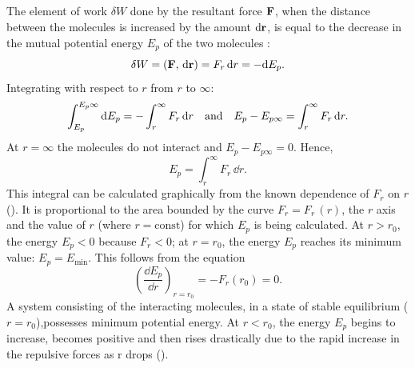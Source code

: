\subsection{}\label{12.1.6} The element of work $\delta W$ done by the resultant force $\vb{F}$, when the distance between the molecules is increased by the amount $\dd \vb{r}$, is equal to the decrease in the mutual potential energy $E_{p}$ of the two molecules :
\begin{equation*}%
\delta W = (\vb{F},\, \dd \vb{r}) = F_{r} \, \dd r = - \dd E_{p}.
\end{equation*}
Integrating with respect to $r$ from $r$ to $\infty$:
\begin{equation*}%
\int_{E_{p}}^{E_{p}\infty} \dd E_{p} = - \int_{r}^{\infty} F_{r} \, \dd r \qand  E_{p} - E_{p \infty} = \int_{r}^{\infty} F_{r} \, \dd r.
\end{equation*}
At $r = \infty$ the molecules do not interact and $E_{p} - E_{p \infty} = 0$. Hence,
\begin{equation*}%
E_{p} = \int_{r}^{\infty} F_{r} \, \dd r.
\end{equation*}
This integral can be calculated graphically from the known de­pendence of $F_{r}$ on $r$ (). It is proportional to the area bounded by the curve $F_{r} = F_{r}\,(r)$, the $r$ axis and the value of $r$ (where $r = \textrm{const}$) for which $E_{p}$ is being calculated. At $r > r_{0}$, the energy $E_{p} < 0$ because $F_{r} < 0$; at $r = r_{0}$, the energy $E_{p}$ reaches its minimum value: $E_{p} = E_{\textrm{min}}$. This follows from the equation
\begin{equation*}%
\left( \frac{\dd E_{p}}{\dd r}\right)_{r = r_{0}} = - F_{r}(r_{0}) = 0.
\end{equation*}
A system consisting of the interacting molecules, in a state of stable equilibrium ($r= r_{0}$),possesses minimum potential energy. At $r < r_{0}$, the energy $E_{p}$ begins to increase, becomes positive and then rises drastically due to the rapid increase in the repulsive forces as r drops ().

